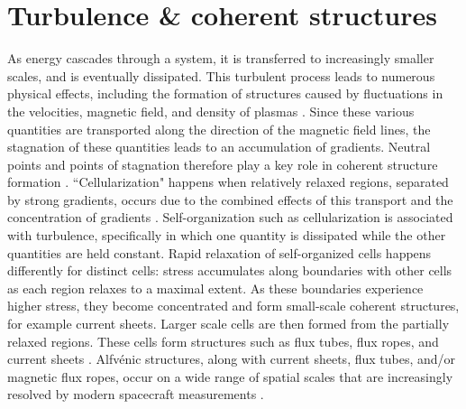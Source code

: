 

\section{Turbulence \& coherent structures}
As energy cascades through a system, it is transferred to increasingly smaller scales, and is eventually dissipated. This turbulent process leads to numerous physical effects, including the formation of structures caused by fluctuations in the velocities, magnetic field, and density of plasmas \citep{Matthaeus:2015}. Since these various quantities are transported along the direction of the magnetic field lines, the stagnation of these quantities leads to an accumulation of gradients. Neutral points and points of stagnation therefore play a key role in coherent structure formation \citep{Matthaeus:2015}. ``Cellularization" happens when relatively relaxed regions, separated by strong gradients, occurs due to the combined effects of this transport and the concentration of gradients \citep{Matthaeus:2015}. Self-organization such as cellularization is associated with turbulence, specifically in which one quantity is dissipated while the other quantities are held constant. Rapid relaxation of self-organized cells happens differently for distinct cells: stress accumulates along boundaries with other cells as each region relaxes to a maximal extent. As these boundaries experience higher stress, they become concentrated and form small-scale coherent structures, for example current sheets. Larger scale cells are then formed from the partially relaxed regions. These cells form structures such as flux tubes, flux ropes, and current sheets \citep{Matthaeus:2015}. Alfv\'enic structures, along with current sheets, flux tubes, and/or magnetic flux ropes, occur on a wide range of spatial scales that are increasingly resolved by modern spacecraft measurements \citep{Greco:2018, Pecora:2019, Zheng:2018, Artemyev:2019}.

